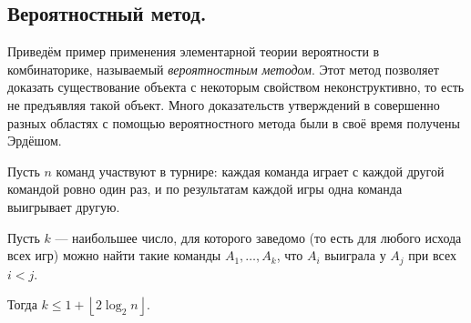 \documentclass[../main.tex]{subfiles}
\begin{document}
\subsection{Вероятностный метод.}

Приведём пример применения элементарной теории вероятности в комбинаторике, называемый \textit{вероятностным методом}. Этот метод позволяет доказать существование объекта с некоторым свойством неконструктивно, то есть не предъявляя такой объект. Много доказательств утверждений в совершенно разных областях с помощью вероятностного метода были в своё время получены Эрдёшом.

\begin{thm}
 \label{thm:erdos_mozer}
 Пусть $ n $ команд  участвуют в турнире: каждая команда  играет с каждой другой командой ровно один раз, и по результатам каждой игры одна команда выигрывает другую.

 Пусть $k$ --- наибольшее число, для которого заведомо (то есть для любого исхода всех игр) можно найти такие команды  $A_1, \ldots, A_k$, что $A_i$ выиграла у $A_j$ при всех $i < j$.

 Тогда $k \leqslant 1 + \left\lfloor 2 \log_2 n  \right\rfloor$.
\end{thm}
\end{document}
